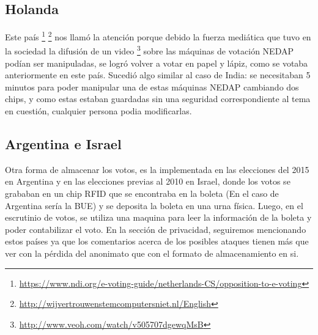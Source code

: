 \subsection{Holanda}
Este país
\footnote{\url{https://www.ndi.org/e-voting-guide/netherlands-CS/opposition-to-e-voting}}  
\footnote{\url{http://wijvertrouwenstemcomputersniet.nl/English}}  
 nos llamó la atención porque debido la fuerza mediática que tuvo en la sociedad la difusión de un video
\footnote{\url{http://www.veoh.com/watch/v505707dgewqMsB}}  
 sobre las máquinas de votación NEDAP podían ser manipuladas,  se logró volver a votar en papel y lápiz, como se votaba anteriormente en este país.  
Sucedió algo similar al caso de India: se necesitaban 5 minutos para poder manipular una de estas máquinas NEDAP cambiando dos chips, y como estas estaban guardadas sin una seguridad correspondiente al tema en cuestión, cualquier persona podia modificarlas.

\subsection{Argentina e Israel}
Otra forma de almacenar los votos, es la implementada en las elecciones del 2015 en Argentina y en las elecciones previas al 2010 en Israel, donde los votos se grababan en un chip RFID que se encontraba en la boleta (En el caso de Argentina sería la BUE) y se deposita la boleta en una urna física. Luego, en el escrutinio de votos, se utiliza una maquina para leer la información de la boleta y poder contabilizar el voto. En la sección de privacidad, seguiremos mencionando estos países ya que los comentarios acerca de los posibles ataques tienen más que ver con la pérdida del anonimato que con el formato de almacenamiento en si.